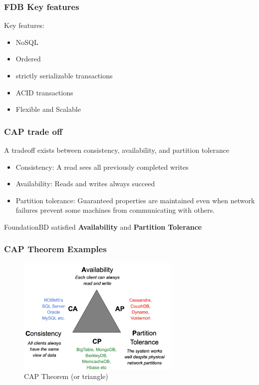 \begin{frame}
	\frametitle{FDB Key features}

Key features:
\begin{itemize}
    \item NoSQL
    \item Ordered
    \item strictly serializable transactions
    \item ACID transactions
    \item Flexible and Scalable
    
\end{itemize}

\end{frame}
\begin{frame}
	\frametitle{CAP trade off}

A tradeoff exists between consistency, availability, and
partition tolerance
\begin{itemize}
    \item Consistency: A read sees all previously completed writes
    \item Availability: Reads and writes always succeed
    \item Partition tolerance: Guaranteed properties are maintained even when network failures prevent some machines from communicating with others.
    
\end{itemize}
FoundationBD satisfied \textbf{Availability} and \textbf{Partition Tolerance} 

\end{frame}
\begin{frame}
	\frametitle{CAP Theorem Examples}

\begin{figure}[h]
    \centering
    \includegraphics[width=0.7\textwidth]{img/1-Introduction/CAP theorem.png}
    \caption{CAP Theorem (or triangle)}
\end{figure}

\end{frame}

